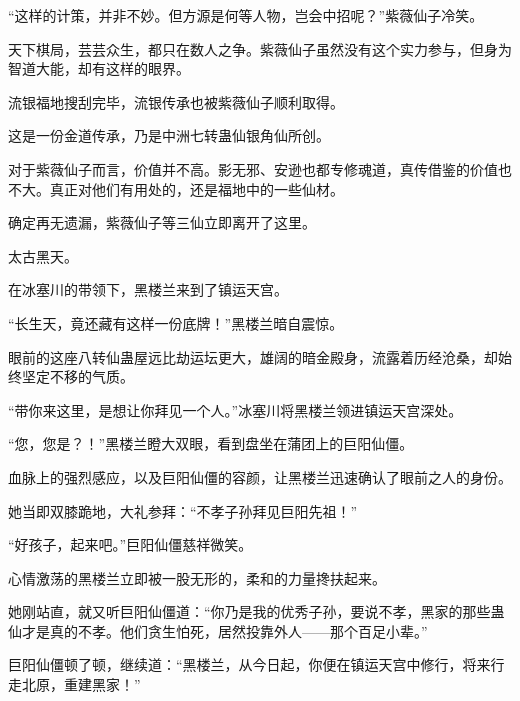 \begin{this_body}
“这样的计策，并非不妙。但方源是何等人物，岂会中招呢？”紫薇仙子冷笑。

天下棋局，芸芸众生，都只在数人之争。紫薇仙子虽然没有这个实力参与，但身为智道大能，却有这样的眼界。

流银福地搜刮完毕，流银传承也被紫薇仙子顺利取得。

这是一份金道传承，乃是中洲七转蛊仙银角仙所创。

对于紫薇仙子而言，价值并不高。影无邪、安逊也都专修魂道，真传借鉴的价值也不大。真正对他们有用处的，还是福地中的一些仙材。

确定再无遗漏，紫薇仙子等三仙立即离开了这里。

太古黑天。

在冰塞川的带领下，黑楼兰来到了镇运天宫。

“长生天，竟还藏有这样一份底牌！”黑楼兰暗自震惊。

眼前的这座八转仙蛊屋远比劫运坛更大，雄阔的暗金殿身，流露着历经沧桑，却始终坚定不移的气质。

“带你来这里，是想让你拜见一个人。”冰塞川将黑楼兰领进镇运天宫深处。

“您，您是？！”黑楼兰瞪大双眼，看到盘坐在蒲团上的巨阳仙僵。

血脉上的强烈感应，以及巨阳仙僵的容颜，让黑楼兰迅速确认了眼前之人的身份。

她当即双膝跪地，大礼参拜：“不孝子孙拜见巨阳先祖！”

“好孩子，起来吧。”巨阳仙僵慈祥微笑。

心情激荡的黑楼兰立即被一股无形的，柔和的力量搀扶起来。

她刚站直，就又听巨阳仙僵道：“你乃是我的优秀子孙，要说不孝，黑家的那些蛊仙才是真的不孝。他们贪生怕死，居然投靠外人——那个百足小辈。”

巨阳仙僵顿了顿，继续道：“黑楼兰，从今日起，你便在镇运天宫中修行，将来行走北原，重建黑家！”

\end{this_body}

